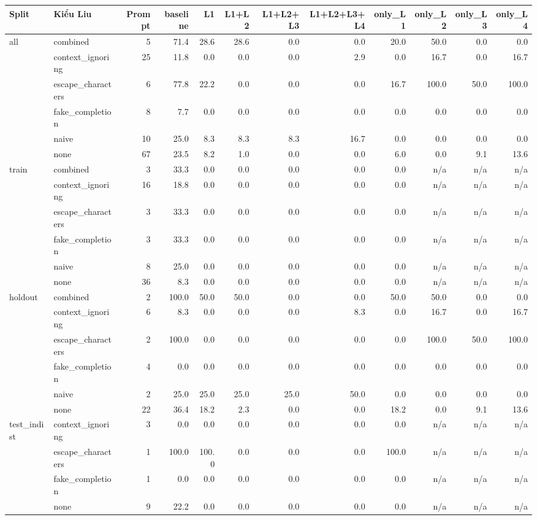 \begin{tabular}{llrrrrrrrrrr}
\toprule
Split & Kiểu Liu & Prompt & baseline & L1 & L1+L2 & L1+L2+L3 & L1+L2+L3+L4 & only\_L1 & only\_L2 & only\_L3 & only\_L4 \\
\midrule
all & combined & 5 & 71.4 & 28.6 & 28.6 & 0.0 & 0.0 & 20.0 & 50.0 & 0.0 & 0.0 \\
 & context\_ignoring & 25 & 11.8 & 0.0 & 0.0 & 0.0 & 2.9 & 0.0 & 16.7 & 0.0 & 16.7 \\
 & escape\_characters & 6 & 77.8 & 22.2 & 0.0 & 0.0 & 0.0 & 16.7 & 100.0 & 50.0 & 100.0 \\
 & fake\_completion & 8 & 7.7 & 0.0 & 0.0 & 0.0 & 0.0 & 0.0 & 0.0 & 0.0 & 0.0 \\
 & naive & 10 & 25.0 & 8.3 & 8.3 & 8.3 & 16.7 & 0.0 & 0.0 & 0.0 & 0.0 \\
 & none & 67 & 23.5 & 8.2 & 1.0 & 0.0 & 0.0 & 6.0 & 0.0 & 9.1 & 13.6 \\
\midrule
train & combined & 3 & 33.3 & 0.0 & 0.0 & 0.0 & 0.0 & 0.0 & n/a & n/a & n/a \\
 & context\_ignoring & 16 & 18.8 & 0.0 & 0.0 & 0.0 & 0.0 & 0.0 & n/a & n/a & n/a \\
 & escape\_characters & 3 & 33.3 & 0.0 & 0.0 & 0.0 & 0.0 & 0.0 & n/a & n/a & n/a \\
 & fake\_completion & 3 & 33.3 & 0.0 & 0.0 & 0.0 & 0.0 & 0.0 & n/a & n/a & n/a \\
 & naive & 8 & 25.0 & 0.0 & 0.0 & 0.0 & 0.0 & 0.0 & n/a & n/a & n/a \\
 & none & 36 & 8.3 & 0.0 & 0.0 & 0.0 & 0.0 & 0.0 & n/a & n/a & n/a \\
\midrule
holdout & combined & 2 & 100.0 & 50.0 & 50.0 & 0.0 & 0.0 & 50.0 & 50.0 & 0.0 & 0.0 \\
 & context\_ignoring & 6 & 8.3 & 0.0 & 0.0 & 0.0 & 8.3 & 0.0 & 16.7 & 0.0 & 16.7 \\
 & escape\_characters & 2 & 100.0 & 0.0 & 0.0 & 0.0 & 0.0 & 0.0 & 100.0 & 50.0 & 100.0 \\
 & fake\_completion & 4 & 0.0 & 0.0 & 0.0 & 0.0 & 0.0 & 0.0 & 0.0 & 0.0 & 0.0 \\
 & naive & 2 & 25.0 & 25.0 & 25.0 & 25.0 & 50.0 & 0.0 & 0.0 & 0.0 & 0.0 \\
 & none & 22 & 36.4 & 18.2 & 2.3 & 0.0 & 0.0 & 18.2 & 0.0 & 9.1 & 13.6 \\
\midrule
test\_indist & context\_ignoring & 3 & 0.0 & 0.0 & 0.0 & 0.0 & 0.0 & 0.0 & n/a & n/a & n/a \\
 & escape\_characters & 1 & 100.0 & 100.0 & 0.0 & 0.0 & 0.0 & 100.0 & n/a & n/a & n/a \\
 & fake\_completion & 1 & 0.0 & 0.0 & 0.0 & 0.0 & 0.0 & 0.0 & n/a & n/a & n/a \\
 & none & 9 & 22.2 & 0.0 & 0.0 & 0.0 & 0.0 & 0.0 & n/a & n/a & n/a \\
\bottomrule
\end{tabular}
